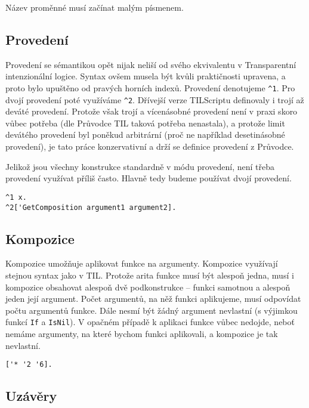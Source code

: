 Název proměnné musí začínat malým písmenem. 
\subsection{Provedení}

Provedení se sémantikou opět nijak neliší od svého ekvivalentu v Transparentní intenzionální logice.
Syntax ovšem musela být kvůli praktičnosti upravena, a proto bylo upuštěno od pravých horních
indexů. Provedení denotujeme \lstinline{^1}. Pro dvojí provedení poté využíváme \lstinline{^2}.
Dřívejší verze TILScriptu definovaly i trojí až deváté provedení. Protože však trojí a vícenásobné
provedení není v praxi skoro vůbec potřeba (dle Průvodce TIL taková potřeba nenastala), a protože
limit devátého provedení byl poněkud arbitrární (proč ne například desetinásobné provedení), je
tato práce konzervativní a drží se definice provedení z Průvodce.

Jelikož jsou všechny konstrukce standardně v módu provedení, není třeba provedení využívat příliš
často. Hlavně tedy budeme používat dvojí provedení.

\begin{lstlisting}[caption={Příklad využití provedení}]
^1 x.
^2['GetComposition argument1 argument2].
\end{lstlisting}

\subsection{Kompozice}

Kompozice umožňuje aplikovat funkce na argumenty. Kompozice využívají stejnou syntax jako v TIL.
Protože arita funkce musí být alespoň jedna, musí i kompozice obsahovat alespoň dvě podkonstrukce
-- funkci samotnou a alespoň jeden její argument. Počet argumentů, na něž funkci aplikujeme, musí
odpovídat počtu argumentů funkce. Dále nesmí být žádný argument nevlastní (s výjimkou funkcí
\lstinline{If} a \lstinline{IsNil}). V opačném případě k aplikaci funkce vůbec nedojde, neboť
nemáme argumenty, na které bychom funkci aplikovali, a kompozice je tak nevlastní.

\begin{lstlisting}[caption={Příklad využití kompozice}]
['* '2 '6].
\end{lstlisting}

\subsection{Uzávěry}

